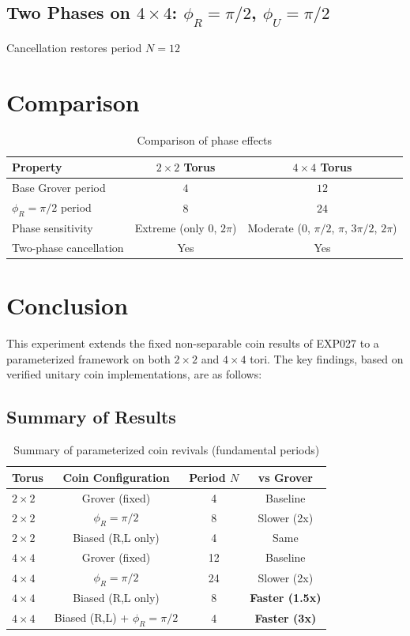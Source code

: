 \documentclass[12pt]{article}
\begin{document}
\subsection{Two Phases on $4 \times 4$: $\phi_R = \pi/2$, $\phi_U = \pi/2$}
Cancellation restores period $N = 12$

\section{Comparison}

\begin{table}[H]
\centering
\caption{Comparison of phase effects}
\begin{tabular}{lcc}
\hline
\textbf{Property} & \textbf{$2 \times 2$ Torus} & \textbf{$4 \times 4$ Torus} \\
\hline
Base Grover period & $4$ & $12$ \\
$\phi_R = \pi/2$ period & $8$ & $24$ \\
Phase sensitivity & Extreme (only $0$, $2\pi$) & Moderate ($0$, $\pi/2$, $\pi$, $3\pi/2$, $2\pi$) \\
Two-phase cancellation & Yes & Yes \\
\hline
\end{tabular}
\end{table}

\section{Conclusion}

This experiment extends the fixed non-separable coin results of EXP027 to a parameterized framework on both $2 \times 2$ and $4 \times 4$ tori. The key findings, based on verified unitary coin implementations, are as follows:

\subsection{Summary of Results}

\begin{table}[!ht]
\centering
\caption{Summary of parameterized coin revivals (fundamental periods)}
\begin{tabular}{lccc}
\hline
\textbf{Torus} & \textbf{Coin Configuration} & \textbf{Period $N$} & \textbf{vs Grover} \\
\hline
$2 \times 2$ & Grover (fixed) & 4 & Baseline \\
$2 \times 2$ & $\phi_R = \pi/2$ & 8 & Slower (2x) \\
$2 \times 2$ & Biased (R,L only) & 4 & Same \\
\hline
$4 \times 4$ & Grover (fixed) & 12 & Baseline \\
$4 \times 4$ & $\phi_R = \pi/2$ & 24 & Slower (2x) \\
$4 \times 4$ & Biased (R,L only) & 8 & \textbf{Faster (1.5x)} \\
$4 \times 4$ & Biased (R,L) + $\phi_R = \pi/2$ & 4 & \textbf{Faster (3x)} \\
\hline
\end{tabular}
\end{table}
\end{document}

